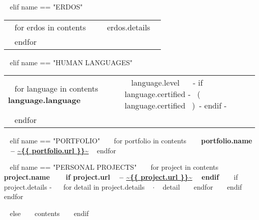 \begin{minipage}{\textwidth}

~{ elif name == "ERDOS" }~

\begin{tabular}{ @{} p{} p{} @{} }
  ~{ for erdos in contents }~
  \small \textcolor{gray}{{\emph{ }}} & {\small ~{{ erdos.details }}~} \\
  ~{ endfor }~
\end{tabular}



~{ elif name == "HUMAN LANGUAGES" }~
  \begin{tabular}{ @{} p{32mm} p{135mm} @{} }
  ~{ for language in contents }~
    \bf {~{{ language.language }}~} & {\small ~{{ language.level }}~ ~{- if language.certified -}~ \small\color{maingrey}\hspace{1mm}(~{{ language.certified }}~)~{- endif -}~} \\
  ~{ endfor }~
  \end{tabular}
  \vspace{50mm}


~{ elif name == "PORTFOLIO" }~
  ~{ for portfolio in contents }~
    {\bf ~{{ portfolio.name }}~ -- \color{maincolor}\url{~{{ portfolio.url }}~} }
    \vspace{1mm}
  ~{ endfor }~
  \vspace{5mm}


~{ elif name == "PERSONAL PROJECTS" }~
  ~{ for project in contents }~
    {\small\bf ~{{ project.name }}~ ~{ if project.url }~ -- \color{maincolor}\url{~{{ project.url }}~} ~{ endif }~ }
    \vspace{1mm}
    ~{ if project.details -}~
    ~{ for detail in project.details }~
      $\cdot$ \small ~{{ detail }}~
    ~{ endfor }~
    ~{ endif }~
    \vspace{3mm}
  ~{ endfor }~
  \vspace{15mm}


\vspace{10mm}
~{ else }~
  ~{{ contents }}~
  \bigskip
~{ endif }~
\end{minipage}


